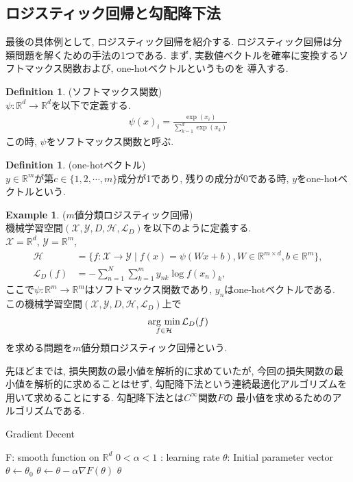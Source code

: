 \documentclass[11pt, a4paper, dvipdfmx]{jsarticle}
\theoremstyle{definition}
\newtheorem{Definition+}[Axiom+]{Definition}
\newtheorem{Example+}[Axiom+]{Example}
\newcommand{\R}{\mathbb{R}}
\newcommand{\X}{\mathcal{X}}
\newcommand{\Y}{\mathcal{Y}}
\newcommand{\Hil}{\mathcal{H}}
\newcommand{\Loss}{\mathcal{L}_{D}}
\newcommand{\MLsp}{(\X, \Y, D, \Hil, \Loss)}
\newcommand{\argmin}{\mathop{\rm arg~min}\limits}
\begin{document}
\subsection{ロジスティック回帰と勾配降下法}
最後の具体例として, ロジスティック回帰を紹介する. 
ロジスティック回帰は分類問題を解くための手法の1つである.
まず, 実数値ベクトルを確率に変換するソフトマックス関数および, one-hotベクトルというものを
導入する. 
\begin{Definition+}(ソフトマックス関数)\\
    $\psi:\R^d\to\R^d$を以下で定義する.
    \begin{align*}
        \psi(x)_{i} = \frac{\exp(x_i)}{\sum_{k = 1}^d\exp(x_k)}
    \end{align*}
    この時, $\psi$をソフトマックス関数と呼ぶ.
\end{Definition+}
\begin{Definition+}(one-hotベクトル)\\
    $y\in\R^m$が第$c\in\{1, 2, \cdots, m\}$成分が1であり, 残りの成分が0である時, 
    $y$をone-hotベクトルという.
\end{Definition+}
\begin{Example+}($m$値分類ロジスティック回帰)\\
    機械学習空間$\MLsp$を以下のように定義する.\\
    $\X=\R^d$, $\Y = \R^m$, 
    \begin{align*}
        \Hil &= \{f:\X\to\Y\mid f(x) = \psi(Wx + b), W\in\R^{m\times d}, b\in\R^m\},\\
        \Loss(f) &= -\sum_{n = 1}^{N}\sum_{k = 1}^{m}y_{nk}\log f(x_n)_{k},
    \end{align*}
    ここで$\psi:\R^m\to\R^m$はソフトマックス関数であり, $y_{n}$はone-hotベクトルである.\\
    この機械学習空間$\MLsp$上で
    \begin{align*}
        \argmin_{f\in\Hil}\Loss(f)
    \end{align*}
    を求める問題を$m$値分類ロジスティック回帰という.
\end{Example+}
先ほどまでは, 損失関数の最小値を解析的に求めていたが, 今回の損失関数の最小値を解析的に求めることはせず,
勾配降下法という連続最適化アルゴリズムを用いて求めることにする. 勾配降下法とは$C^{\infty}$関数$F$の
最小値を求めるためのアルゴリズムである.
\begin{algorithm}[H]
    \caption{Gradient Decent}
    \begin{algorithmic}
        \REQUIRE F: smooth function on $\R^{d}$
        \REQUIRE $0<\alpha<1$ : learning rate 
        \REQUIRE $\theta$: Initial parameter vector
        \STATE $\theta\leftarrow\theta_{0}$
        \STATE $\theta\leftarrow\theta - \alpha\nabla F(\theta)$ 
        \ENDWHILE
        \RETURN $\theta$
    \end{algorithmic}
\end{algorithm}
\end{document}
